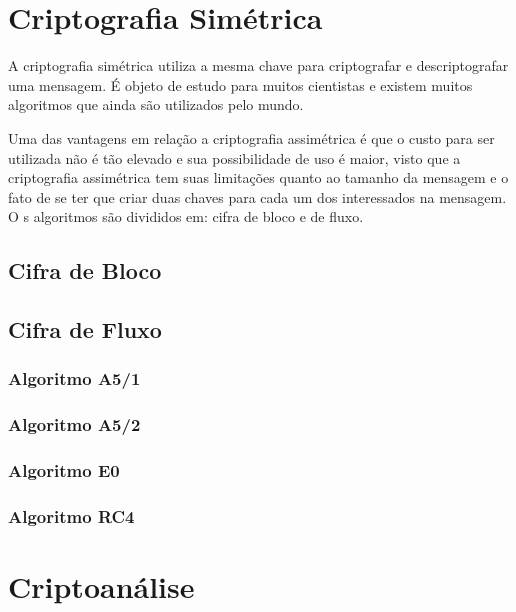%
\section{Criptografia Simétrica}
\label{symmetric-cryptography}

A criptografia simétrica utiliza a mesma chave para criptografar e descriptografar uma mensagem. É objeto de estudo para muitos cientistas e existem muitos algoritmos que ainda são utilizados pelo mundo. 

Uma das vantagens em relação a criptografia assimétrica é que o custo para ser utilizada não é tão elevado e sua possibilidade de uso é maior, visto que a criptografia assimétrica tem suas limitações quanto ao tamanho da mensagem e o fato de se ter que criar duas chaves para cada um dos interessados na mensagem. O s algoritmos são divididos em: cifra de bloco e de fluxo.

\subsection{Cifra de Bloco}
\label{block-cipher}

\subsection{Cifra de Fluxo}
\label{stream-cipher}

\subsubsection{Algoritmo A5/1}
\label{algorithm-a51}

\subsubsection{Algoritmo A5/2}
\label{algorithm-a52}

\subsubsection{Algoritmo E0}
\label{algorithm-e0}

\subsubsection{Algoritmo RC4}
\label{algorithm-rc4}

\section{Criptoanálise}